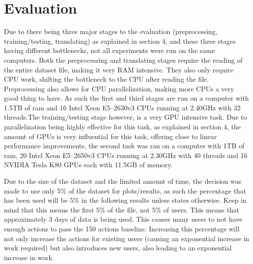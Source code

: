 \chapter{Evaluation}\label{ch:evaluation}

Due to there being three major stages to the evaluation (preprocessing, training/testing, translating) as explained in section 4, and these three stages having different bottlenecks, not all experiments were run on the same computers. Both the preprocessing and translating stages require the reading of the entire dataset file, making it very RAM intensive. They also only require CPU work, shifting the bottleneck to the CPU after reading the file. Preprocessing also allows for CPU parallelization, making more CPUs a very good thing to have. As such the first and third stages are run on a computer with 1.5TB of ram and 16 Intel Xeon E5--2630v3 CPUs running at 2.40GHz with 32 threads.The training/testing stage however, is a very GPU intensive task. Due to parallelization being highly effective for this task, as explained in section 4, the amount of GPUs is very influential for this task, offering close to linear performance improvements, the second task was ran on a computer with 1TB of ram, 20 Intel Xeon E5--2650v3 CPUs running at 2.30GHz with 40 threads and 16 NVIDIA Tesla K80 GPUs each with 11.5GB of memory. 

Due to the size of the dataset and the limited amount of time, the decision was made to use only 5\% of the dataset for plots/results, as such the percentage that has been used will be 5\% in the following results unless states otherwise. Keep in mind that this means the first 5\% of the file, not 5\% of users. This means that approximately 3 days of data is being used. This causes many users to not have enough actions to pass the 150 actions baseline. Increasing this percentage will not only increase the actions for existing users (causing an exponential increase in work required) but also introduces new users, also leading to an exponential increase in work. 

